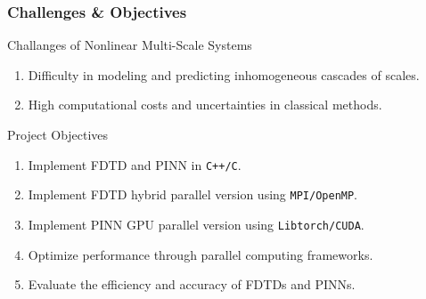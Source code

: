 \begin{frame}
  \frametitle{Challenges \& Objectives}
  \begin{block}{Challanges of Nonlinear Multi-Scale Systems}
    \begin{enumerate}
      \item Difficulty in modeling and predicting inhomogeneous cascades of scales.
      \item High computational costs and uncertainties in classical methods.
    \end{enumerate}    
  \end{block}

  \begin{block}{Project Objectives}
    \begin{enumerate}
      \item Implement FDTD and PINN in \texttt{C++/C}.
      \item Implement FDTD hybrid parallel version using \texttt{MPI/OpenMP}.
      \item Implement PINN GPU parallel version using \texttt{Libtorch/CUDA}.
      \item Optimize performance through parallel computing frameworks.
      \item Evaluate the efficiency and accuracy of FDTDs and PINNs.
    \end{enumerate}
  \end{block}
\end{frame}


